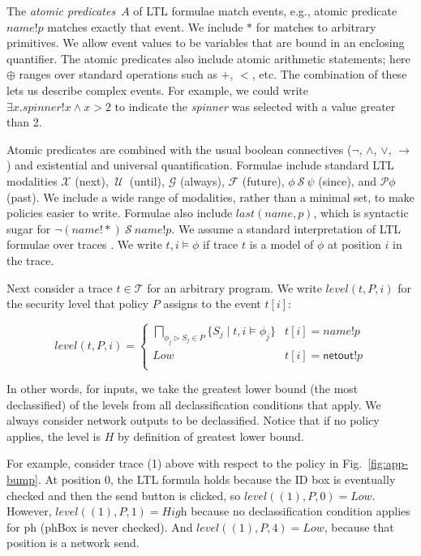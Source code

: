 \documentclass{llncs}
\newcommand{\code}[1]{\textsf{#1}} \newcommand{\bcode}[1]{\texttt{#1}}
\newcommand{\aset}[1]{\{#1\}}
\newcommand{\sch}{\textit{name}}
\newcommand{\tr}{t\xspace}
\newcommand{\tset}{\ensuremath{\mathcal{T}}\xspace}
\newcommand{\tnext}{\mathcal{X}}
\newcommand{\talways}{\mathcal{G}}
\newcommand{\tfuture}{\mathcal{F}}
\newcommand{\tuntil}{~\mathcal{U}~}
\newcommand{\tsince}{~\mathcal{S}~}
\newcommand{\tpast}{\mathcal{P}}
\newcommand{\tlast}[2]{\textit{last}(#1, #2)}
\newcommand{\tlevel}[3]{\textit{level}(#1, #2, #3)}
\begin{document}
The \emph{atomic predicates}~$A$ of LTL formulae match events,
e.g., atomic predicate $\sch!p$ matches exactly that event.
We include $\ast$ for matches to
arbitrary primitives. We allow event values to be
variables that are bound in an enclosing quantifier. The atomic
predicates also include atomic arithmetic
statements; here $\oplus$ ranges over standard operations such as $+$,
$<$, etc.  
The combination of these lets us describe complex
events. For example, we could write
$\exists x. \textit{spinner}!x \wedge x > 2$ to indicate the
\emph{spinner} was selected with a value greater than 2.

Atomic predicates are combined with the usual boolean connectives
($\neg$, $\wedge$, $\vee$, $\rightarrow$) and existential and
universal quantification.  Formulae include standard LTL
modalities $\tnext$ (next), $\tuntil$
(until), $\talways$ (always), $\tfuture$ (future), $\phi \tsince \psi$
(since), and $\tpast \phi$ (past). We include a wide range of
modalities, rather than a minimal set, to make policies easier to write.
Formulae also include
$\tlast{\sch}{p}$, which is syntactic sugar for $\lnot (\sch!\ast)
\tsince \sch!p$.
We assume a standard interpretation of LTL formulae over
traces \cite{Lichtenstein:85}.
We write $\tr, i \models \phi$ if trace $\tr$ is a model of $\phi$ at
position $i$ in the trace.







Next consider a trace $\tr \in \tset$ for an arbitrary program.
We write $\tlevel{\tr}{P}{i}$ for the security level that policy
$P$ assigns to the event $\tr[i]$:

\begin{displaymath}
  \tlevel{\tr}{P}{i} =
  \begin{cases}
    \bigsqcap_{\phi_j\rhd S_j \in P} \aset{ S_j \mid \tr, i \models
      \phi_j } & \tr[i] = \sch!p \\
    \textit{Low} & \tr[i] = \code{netout}!p \\
  \end{cases}
\end{displaymath}

In other words, for inputs, we take the greatest lower bound (the most
declassified) of the levels from all declassification conditions that
apply. We always consider network outputs to be
declassified. Notice that if no policy applies, the level is $H$ by
definition of greatest lower bound.

For example, consider trace (1) above with
respect to the policy in Fig.~\ref{fig:app-bump}.  At position 0, the
LTL formula holds because the ID box is eventually checked and then
the send button is clicked, so $\tlevel{(1)}{P}{0} =
\textit{Low}$. However,
$\tlevel{(1)}{P}{1} = \textit{High}$ because no
declassification condition applies for \code{ph}
(\code{phBox} is never checked). And $\tlevel{(1)}{P}{4} =
\textit{Low}$, because that position is a network send.
\end{document}
